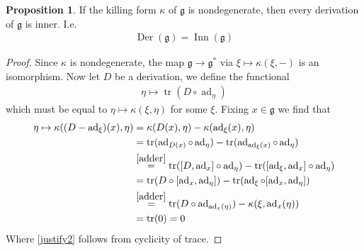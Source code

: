 \documentclass[10.5pt]{article}
\theoremstyle{definition}
\newtheorem{proposition}{Proposition}
\numberwithin{example}{subsection}
\numberwithin{proposition}{subsection}
\numberwithin{pb}{subsection}
\begin{document}
        \begin{proposition}\label{derivationsareinner}
            If the killing form \(\kappa\) of \(\mathfrak{g}\) is nondegenerate, then every derivation of \(\mathfrak{g}\) is inner. I.e.
            \begin{align}
                \operatorname{Der}(\mathfrak{g}) = \operatorname{Inn}(\mathfrak{g})
            \end{align}

            \begin{proof}
                Since \(\kappa\) is nondegenerate, the map \(\mathfrak{g} \to \mathfrak{g}^*\) via \(\xi \mapsto \kappa(\xi,-)\) is an isomorphism. Now let \(D\) be a derivation, we define the functional
                \begin{align}
                    \eta \mapsto \operatorname{tr}(D\circ \operatorname{ad}_\eta)
                \end{align}
                which must be equal to \(\eta \mapsto \kappa(\xi,\eta)\) for some \(\xi\). Fixing \(x \in \mathfrak{g}\) we find that
                \begin{align}
                    \eta \mapsto \kappa((D - \operatorname{ad}_\xi)(x),\eta) &= \kappa(D(x),\eta) - \kappa(\operatorname{ad}_\xi(x),\eta) \\
                    &= \operatorname{tr}(\operatorname{ad}_{D(x)}\circ \operatorname{ad}_\eta) - \operatorname{tr}(\operatorname{ad}_{\operatorname{ad}_{\xi}(x)}\circ \operatorname{ad}_\eta) \\
                    &\overset{\eqref{adder}}{=} \operatorname{tr}([D,\operatorname{ad}_x]\circ \operatorname{ad}_\eta) - \operatorname{tr}([\operatorname{ad}_\xi,\operatorname{ad}_x]\circ \operatorname{ad}_\eta) \\
                    &= \operatorname{tr}(D\circ[\operatorname{ad}_x,\operatorname{ad}_\eta]) - \operatorname{tr}(\operatorname{ad}_\xi\circ[\operatorname{ad}_x,\operatorname{ad}_\eta]) \label{justify2} \\
                    &\overset{\eqref{adder}}{=} \operatorname{tr}(D\circ \operatorname{ad}_{\operatorname{ad}_x(\eta)}) - \kappa(\xi,\operatorname{ad}_x(\eta)) \\
                    &= \operatorname{tr}(0) = 0
                \end{align}
                Where \eqref{justify2} follows from cyclicity of trace.
            \end{proof}
        \end{proposition}
\end{document}
